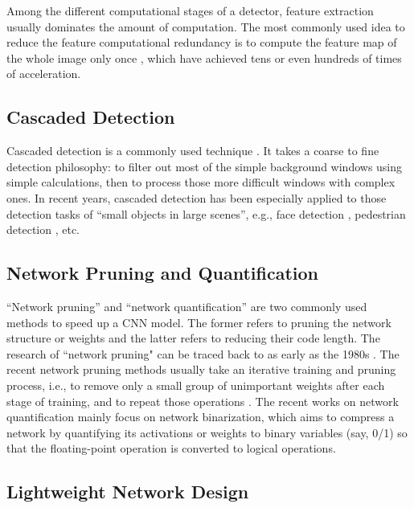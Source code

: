 \documentclass[lettersize,journal]{IEEEtran}
\begin{document}
Among the different computational stages of a detector, feature extraction usually dominates the amount of computation. The most commonly used idea to reduce the feature computational redundancy is to compute the feature map of the whole image only once \cite{CVPR06-FastHOG, ICCV15-FastRCNN, NIPS15-FasterRCNN}, which have achieved tens or even hundreds of times of acceleration.



\subsection{Cascaded Detection}\label{subsec:cascaded_detc}

Cascaded detection is a commonly used technique \cite{CVPR01-VJ, IJCV01-Coarse2Fine}. It takes a coarse to fine detection philosophy: to filter out most of the simple background windows using simple calculations, then to process those more difficult windows with complex ones. In recent years, cascaded detection has been especially applied to those detection tasks of ``small objects in large scenes'', e.g., face detection \cite{CVPR15-CNNCascadeFace, SPL16-JointFaceCascade}, pedestrian detection \cite{CVPR06-FastHOG, ECCV16-FasterPed, ICCV15-CompAwaCasPed}, etc.



\subsection{Network Pruning and Quantification}
``Network pruning'' and ``network quantification'' are two commonly used methods to speed up a CNN model. The former refers to pruning the network structure or weights and the latter refers to reducing their code length. The research of ``network pruning" can be traced back to as early as the 1980s \cite{NIPS89-OptBrainDamage}. The recent network pruning methods usually take an iterative training and pruning process, i.e., to remove only a small group of unimportant weights after each stage of training, and to repeat those operations \cite{UCLR16-Compress}. The recent works on network quantification mainly focus on network binarization, which aims to compress a network by quantifying its activations or weights to binary variables (say, 0/1) so that the floating-point operation is converted to logical operations.


\subsection{Lightweight Network Design}
\end{document}
